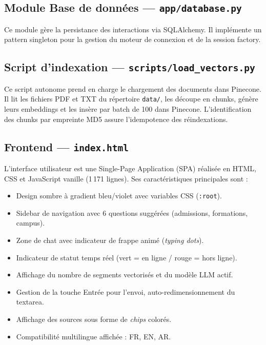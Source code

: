 \documentclass[12pt, a4paper, twoside]{report}
\newcommand{\file}[1]{\texttt{\footnotesize #1}}
\begin{document}
\subsection{Module Base de données --- \file{app/database.py}}

Ce module gère la persistance des interactions via SQLAlchemy. Il implémente un pattern singleton pour la gestion du moteur de connexion et de la session factory.

\subsection{Script d'indexation --- \file{scripts/load\_vectors.py}}

Ce script autonome prend en charge le chargement des documents dans Pinecone. Il lit les fichiers PDF et TXT du répertoire \file{data/}, les découpe en chunks, génère leurs embeddings et les insère par batch de 100 dans Pinecone. L'identification des chunks par empreinte MD5 assure l'idempotence des réindexations.

\subsection{Frontend --- \file{index.html}}

L'interface utilisateur est une Single-Page Application (SPA) réalisée en HTML, CSS et JavaScript vanille (1\,171 lignes). Ses caractéristiques principales sont :

\begin{itemize}
  \item Design sombre à gradient bleu/violet avec variables CSS (\texttt{:root}).
  \item Sidebar de navigation avec 6 questions suggérées (admissions, formations, campus).
  \item Zone de chat avec indicateur de frappe animé (\textit{typing dots}).
  \item Indicateur de statut temps réel (vert = en ligne / rouge = hors ligne).
  \item Affichage du nombre de segments vectorisés et du modèle LLM actif.
  \item Gestion de la touche Entrée pour l'envoi, auto-redimensionnement du textarea.
  \item Affichage des sources sous forme de \textit{chips} colorés.
  \item Compatibilité multilingue affichée : FR, EN, AR.
\end{itemize}
\end{document}
